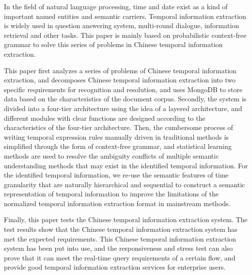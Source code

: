 \begin{abstract*}
  In the field of natural language processing, time and date exist as a kind of important named entities and semantic carriers.
  Temporal information extraction is widely used in question answering system, multi-round dialogue, information retrieval and other tasks.
  This paper is mainly based on probabilistic context-free grammar to solve this series of problems in Chinese temporal information extraction.

  This paper first analyzes a series of problems of Chinese temporal information extraction, and decomposes Chinese temporal information extraction into two specific requirements for recognition and resolution, 
  and uses MongoDB to store data based on the characteristics of the document corpus.
  Secondly, the system is divided into a four-tier architecture using the idea of ​​a layered architecture, and different modules with clear functions are designed according to the characteristics of the four-tier architecture.
  Then, the cumbersome process of writing temporal expression rules manually driven in traditional methods is simplified through the form of context-free grammar, 
  and statistical learning methods are used to resolve the ambiguity conflicts of multiple semantic understanding methods that may exist in the identified temporal information.
  For the identified temporal information, we re-use the semantic features of time granularity that are naturally hierarchical and sequential to construct 
  a semantic representation of temporal information to improve the limitations of the normalized temporal information extraction format in mainstream methods.

  Finally, this paper tests the Chinese temporal information extraction system. 
  The test results show that the Chinese temporal information extraction system has met the expected requirements.
  This Chinese temporal information extraction system has been put into use, 
  and the responsiveness and stress test can also prove that it can meet the real-time query requirements of a certain flow, and provide good temporal information extraction services for enterprise users.


\end{abstract*}
